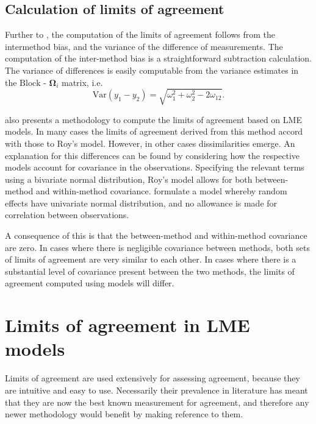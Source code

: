 \documentclass[12pt, a4paper]{report}
\theoremstyle{plain}
\theoremstyle{definition}
\theoremstyle{remark}
\begin{document}
\newpage



	\subsection{Calculation of limits of agreement }
	
	
	Further to \citet{BA86}, the computation of the limits of agreement follows from the intermethod bias, and the variance of the difference of measurements. The computation of the inter-method bias is a straightforward subtraction calculation. The variance of differences is easily computable from the variance estimates in the ${\mbox{Block - }\boldsymbol \Omega_{i}}$ matrix, i.e.
	\[
	\mathrm{Var}(y_1 - y_2) = \sqrt{ \omega^2_1 + \omega^2_2 - 2\omega_{12}}.
	\]
	
	\citet{BXC2008} also presents a methodology to compute the limits of agreement based on LME models. In many cases the limits of agreement derived from this method accord with those to Roy's model. However, in other cases dissimilarities emerge. An explanation for this differences can be found by considering how the respective models account for covariance in the observations. Specifying the relevant terms using a bivariate normal distribution, Roy's model allows for both between-method and within-method covariance. \citet{BXC2008} formulate a model whereby random effects have univariate normal distribution, and no allowance is made for correlation between observations.
	
	A consequence of this is that the between-method and within-method covariance are zero. In cases where there is negligible covariance between methods, both sets of limits of agreement are very similar to each other. In cases where there is a substantial level of covariance present between the two methods, the limits of agreement computed using models will differ.
	
	
	
	
	
	\section{Limits of agreement in LME models}
	
	Limits of agreement are used extensively for assessing agreement, because they are intuitive and easy to use.
	Necessarily their prevalence in literature has meant that they are now the best known measurement for agreement, and therefore any newer methodology would benefit by making reference to them.
	
\end{document}
